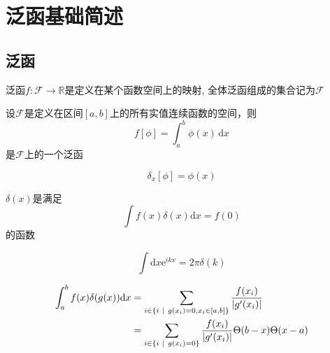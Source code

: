 \newpage
\section{泛函基础简述}
\subsection{泛函}
\begin{definition}[泛函]
    泛函$f: \mathscr{F} \to \mathbb{R}$是定义在某个函数空间上的映射, 全体泛函组成的集合记为$\mathcal{F}$
\end{definition}
\begin{example}
    设$\mathcal{F}$是定义在区间$[a,b]$上的所有实值连续函数的空间，则
    \begin{equation}
        f[\phi] = \int_a^b \phi(x) \, \mathrm{d}x
    \end{equation}
    是$\mathcal{F}$上的一个泛函
\end{example}
\begin{example}\label{functional-delta}
    \begin{equation}
        \delta_x[\phi]=\phi(x)
    \end{equation}
\end{example}

\begin{definition}[$\delta$函数]
    $\delta(x)$是满足
    \begin{equation}
        \int f(x) \delta(x) \mathrm dx = f(0)
    \end{equation}
    的函数
\end{definition}
\begin{theorem}
    \begin{equation}
        \int \mathrm dx \mathrm e^{ikx}=2\pi \delta(k)\label{matheq1}
    \end{equation}
\end{theorem}
\begin{theorem}
    \begin{align}
        \int_a^b f(x) \delta(g(x)) \mathrm dx &= \sum_{i\in \{i~|~g(x_i)=0, x_i\in[a, b]\}}\frac{f(x_i)}{|g'(x_i)|}\notag\\
        &= \sum_{i\in \{i~|~g(x_i)=0\}}\frac{f(x_i)}{|g'(x_i)|}\Theta(b-x)\Theta(x-a)
    \end{align}
\end{theorem}

